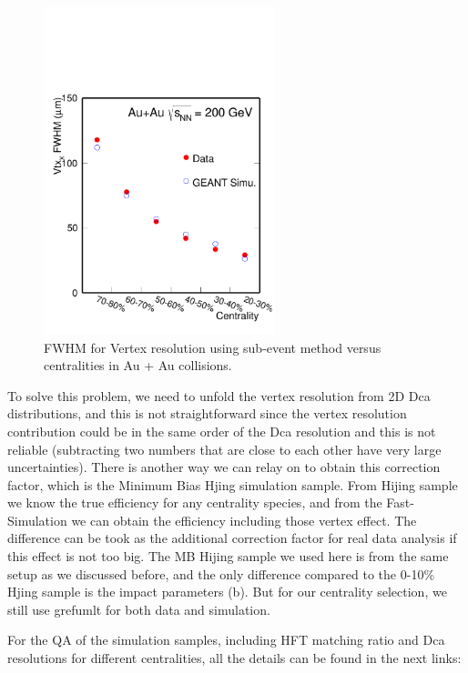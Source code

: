 \begin{figure}
\centering
\includegraphics[width=0.6\textwidth]{figure/Run14_D0HFT/vtxX_vsCent.pdf}
\caption{ FWHM for Vertex resolution using sub-event method versus centralities in Au + Au collisions.}
\label{vtxX_vsCent} 
\end{figure}

To solve this problem, we need to unfold the vertex resolution from 2D Dca distributions, and this is not straightforward since the vertex resolution contribution could be in the same order of the Dca resolution and this is not reliable (subtracting two numbers that are close to each other have very large uncertainties). There is another way we can relay on to obtain this correction factor, which is the Minimum Bias Hjing simulation sample. From Hijing sample we know the true efficiency for any centrality species, and from the Fast-Simulation we can obtain the efficiency including those vertex effect. The difference can be took as the additional correction factor for real data analysis if this effect is not too big. The MB Hijing sample we used here is from the same setup as we discussed before, and the only difference compared to the 0-10\% Hjing sample is the impact parameters (b). But for our centrality selection, we still use grefumlt for both data and simulation.

For the QA of the simulation samples, including HFT matching ratio and Dca resolutions for different centralities, all the details can be found in the next links:

